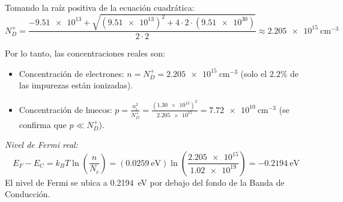 \begin{problema}
Tomando la raíz positiva de la ecuación cuadrática:
\[
N_D^+ = \frac{-\num{9.51e13} + \sqrt{(\num{9.51e13})^2 + 4 \cdot 2 \cdot (\num{9.51e30})}}{2 \cdot 2} \approx \SI{2.205e15}{\cm^{-3}}
\]

Por lo tanto, las concentraciones reales son:
\begin{itemize}
    \item Concentración de electrones: $n = N_D^+ = \SI{2.205e15}{\cm^{-3}}$ (solo el $2.2\%$ de las impurezas están ionizadas).
    \item Concentración de huecos: $p = \frac{n_i^2}{N_D^+} = \frac{(\num{1.30e13})^2}{\num{2.205e15}} = \SI{7.72e10}{\cm^{-3}}$ (se confirma que $p \ll N_D^+$).
\end{itemize}

\textit{Nivel de Fermi real:}
\[
E_F - E_C = k_B T \ln\left( \frac{n}{N_c} \right) = (\SI{0.0259}{\eV}) \ln\left( \frac{\num{2.205e15}}{\num{1.02e19}} \right) = \SI{-0.2194}{\eV}
\]
El nivel de Fermi se ubica a \SI{0.2194}{\eV} por debajo del fondo de la Banda de Conducción.
\end{problema}


